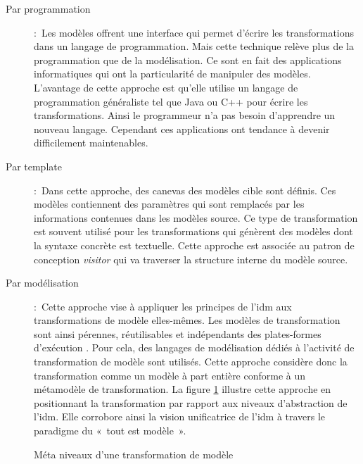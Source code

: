 \begin{description}

\item[Par programmation]:~Les modèles offrent une interface qui permet d'écrire les transformations dans 
un langage de programmation. Mais cette technique relève plus de la 
programmation que de la modélisation. Ce sont en fait des applications 
informatiques qui ont la particularité de manipuler des modèles. L'avantage de 
cette approche est qu'elle utilise un langage de programmation généraliste tel 
que Java ou C++ pour écrire les transformations. Ainsi le programmeur n'a pas 
besoin d'apprendre un nouveau langage. Cependant ces applications ont tendance à 
devenir difficilement maintenables.

\item [Par template]:~Dans cette approche, des canevas des modèles cible sont définis. Ces modèles contiennent des paramètres qui sont remplacés par les informations contenues 
dans les modèles source. Ce type de transformation est souvent utilisé pour les 
transformations qui génèrent des modèles dont la syntaxe concrète est textuelle.  Cette approche est associée au patron de conception \textit{visitor} qui va traverser la structure interne du modèle source. 

\item [Par modélisation]:~Cette approche vise à appliquer les principes de l'\gls{idm} aux transformations de modèle elles-mêmes. Les modèles de transformation sont ainsi pérennes, réutilisables et indépendants des plates-formes d'exécution  \cite{bezivin2006model}. Pour cela, des langages de modélisation dédiés à l'activité de transformation de modèle sont utilisés. Cette approche considère donc la transformation comme 
un modèle à part entière conforme à un métamodèle de transformation. La figure 
\ref{fig:TransfoPrincipe} illustre cette approche en positionnant la transformation par rapport aux niveaux d'abstraction de l'\gls{idm}. Elle corrobore 
ainsi la vision unificatrice de l'\gls{idm} à travers le paradigme du «~tout est 
modèle~»\cite{bezivin2005unification}.
\end{description}


\begin{figure}[!ht]
 \begin{center}
  
 \end{center}
 \caption{Méta niveaux d'une transformation de modèle}
 \label{fig:TransfoPrincipe}
\end{figure}


